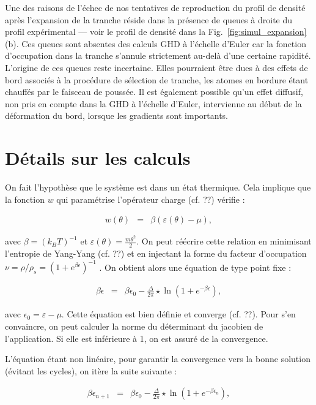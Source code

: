 Une des raisons de l'échec de nos tentatives de reproduction du profil de densité après l'expansion de la tranche réside dans la présence de queues à droite du profil expérimental — voir le profil de densité dans la Fig.~\ref{fig:simul_expansion}(b). Ces queues sont absentes des calculs GHD à l’échelle d’Euler car la fonction d’occupation dans la tranche s’annule strictement au-delà d’une certaine rapidité. L’origine de ces queues reste incertaine. Elles pourraient être dues à des effets de bord associés à la procédure de sélection de tranche, les atomes en bordure étant chauffés par le faisceau de poussée. Il est également possible qu’un effet diffusif, non pris en compte dans la GHD à l’échelle d’Euler, intervienne au début de la déformation du bord, lorsque les gradients sont importants.

\section{Détails sur les calculs}
\label{sec:calcule}

On fait l'hypothèse que le système est dans un état thermique. Cela implique que la fonction $w$ qui paramétrise l'opérateur charge (cf. ??) vérifie :

\begin{eqnarray*}
	w(\theta) & = &  \beta(\varepsilon(\theta) - \mu),
\end{eqnarray*}

avec $\beta = (k_B T)^{-1}$ et $\varepsilon(\theta) = \frac{m \theta^2}{2}$. On peut réécrire cette relation en minimisant l'entropie de Yang-Yang (cf. ??) et en injectant la forme du facteur d'occupation $\nu = \rho/\rho_s = (1+e^{\beta \epsilon})^{-1}$ . On obtient alors une équation de type point fixe :

\begin{eqnarray*}
	\beta \epsilon & = & \beta \epsilon_0 -  \frac{\Delta}{2\pi} \star \ln \left( 1 + e^{-\beta \epsilon} \right) ,
\end{eqnarray*}

avec $\epsilon_0 = \varepsilon - \mu$. Cette équation est bien définie et converge (cf. ??). Pour s'en convaincre, on peut calculer la norme du déterminant du jacobien de l'application. Si elle est inférieure à 1, on est assuré de la convergence. 

L'équation étant non linéaire, pour garantir la convergence vers la bonne solution (évitant les cycles), on itère la suite suivante :

\begin{eqnarray*}
	\beta \epsilon_{n+1} & = & \beta \epsilon_0 -   \frac{\Delta}{2\pi} \star \ln \left( 1 + e^{-\beta \epsilon_n} \right) ,
\end{eqnarray*}

